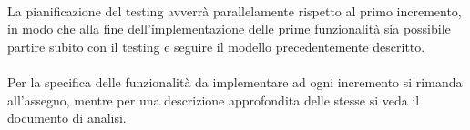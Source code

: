 \paragraph{} La pianificazione del testing avverrà parallelamente rispetto al primo incremento, in modo che alla fine dell'implementazione delle prime funzionalità sia possibile partire subito con il testing e seguire il modello precedentemente descritto.
\paragraph{} Per la specifica delle funzionalità da implementare ad ogni incremento si rimanda all'assegno, mentre per una descrizione approfondita delle stesse si veda il documento di analisi.